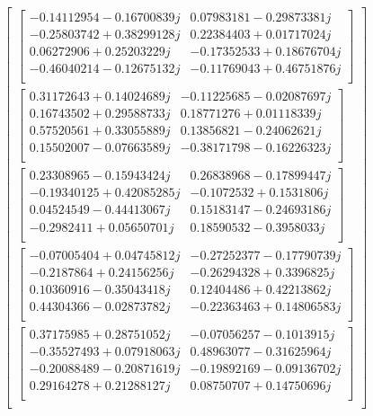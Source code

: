 \documentclass[conference]{IEEEtran}
\begin{document}
{\scriptsize
$$
\begin{bmatrix}
\begin{bmatrix}
-0.14112954-0.16700839j& 0.07983181-0.29873381j\\
-0.25803742+0.38299128j& 0.22384403+0.01717024j\\
0.06272906+0.25203229j& -0.17352533+0.18676704j\\
-0.46040214-0.12675132j& -0.11769043+0.46751876j\\
\end{bmatrix}\\
\begin{bmatrix}
0.31172643+0.14024689j& -0.11225685-0.02087697j\\
0.16743502+0.29588733j&  0.18771276+0.01118339j\\
0.57520561+0.33055889j&  0.13856821-0.24062621j\\
0.15502007-0.07663589j& -0.38171798-0.16226323j\\
\end{bmatrix}\\
\begin{bmatrix}
0.23308965-0.15943424j& 0.26838968-0.17899447j\\
-0.19340125+0.42085285j&-0.1072532 +0.1531806j\\
0.04524549-0.44413067j& 0.15183147-0.24693186j\\
-0.2982411 +0.05650701j&  0.18590532-0.3958033j\\
\end{bmatrix}\\
\begin{bmatrix}
-0.07005404+0.04745812j& -0.27252377-0.17790739j\\
-0.2187864 +0.24156256j& -0.26294328+0.3396825j\\
0.10360916-0.35043418j&  0.12404486+0.42213862j\\
0.44304366-0.02873782j& -0.22363463+0.14806583j\\
\end{bmatrix}\\
\begin{bmatrix}
0.37175985+0.28751052j &-0.07056257-0.1013915j\\  
-0.35527493+0.07918063j & 0.48963077-0.31625964j\\
-0.20088489-0.20871619j &-0.19892169-0.09136702j\\
0.29164278+0.21288127j  &0.08750707+0.14750696j\\
\end{bmatrix}\\

\end{bmatrix}$$}
\end{document}
